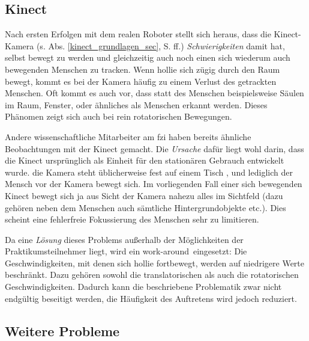 \subsection{Kinect}

Nach ersten Erfolgen mit dem realen Roboter stellt sich heraus, dass die Kinect-Kamera (s. Abs. \ref{kinect_grundlagen_sec}, S. \pageref{kinect_grundlagen_sec} ff.) \emph{Schwierigkeiten} damit hat, selbst bewegt zu werden und gleichzeitig auch noch einen sich wiederum auch bewegenden Menschen zu tracken.
Wenn \gls{hollie} sich zügig durch den Raum bewegt, kommt es bei der Kamera häufig zu einem Verlust des getrackten Menschen.
Oft kommt es auch vor, dass statt des Menschen beispielsweise Säulen im Raum, Fenster, oder ähnliches als Menschen erkannt werden.
Dieses Phänomen zeigt sich auch bei rein rotatorischen Bewegungen.

Andere wissenschaftliche Mitarbeiter am \gls{fzi} haben bereits ähnliche Beobachtungen mit der Kinect gemacht.
Die \emph{Ursache} dafür liegt wohl darin, dass die Kinect ursprünglich als Einheit für den stationären Gebrauch entwickelt wurde.
\Dh die Kamera steht üblicherweise fest auf einem Tisch \oae, und lediglich der Mensch vor der Kamera bewegt sich.
Im vorliegenden Fall einer sich bewegenden Kinect bewegt sich ja aus Sicht der Kamera nahezu alles im Sichtfeld (dazu gehören neben dem Menschen auch sämtliche Hintergrundobjekte etc.).
Dies scheint eine fehlerfreie Fokussierung des Menschen sehr zu limitieren.

Da eine \emph{Lösung} dieses Problems außerhalb der Möglichkeiten der Praktikumsteilnehmer liegt, wird ein \glqq work-around\grqq\ eingesetzt:
Die Geschwindigkeiten, mit denen sich \gls{hollie} fortbewegt, werden auf niedrigere Werte beschränkt.
Dazu gehören sowohl die translatorischen als auch die rotatorischen Geschwindigkeiten.
Dadurch kann die beschriebene Problematik zwar nicht endgültig beseitigt werden, die Häufigkeit des Auftretens wird jedoch reduziert.




\subsection{Weitere Probleme}

